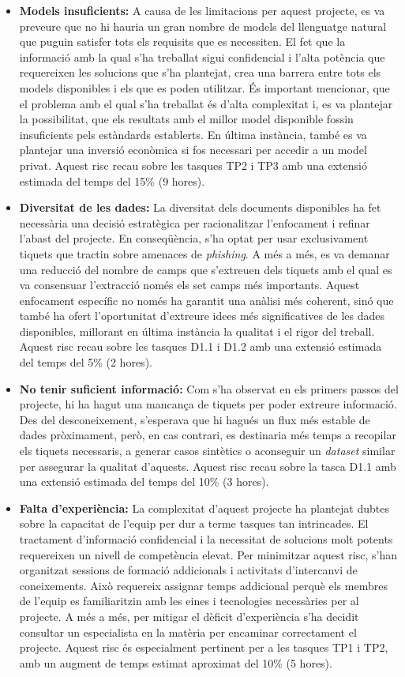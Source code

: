 \begin{itemize}
    \item \textbf{Models insuficients:} A causa de les limitacions per aquest projecte, es va preveure que no hi hauria un gran nombre de models del llenguatge natural que puguin satisfer tots els requisits que es necessiten. El fet que la informació amb la qual s'ha treballat sigui confidencial i l'alta potència que requereixen les solucions que s'ha plantejat, crea una barrera entre tots els models disponibles i els que es poden utilitzar. És important mencionar, que el problema amb el qual s'ha treballat és d'alta complexitat i, es va plantejar la possibilitat, que els resultats amb el millor model disponible fossin insuficients pels estàndards establerts. En última instància, també es va plantejar una inversió econòmica si fos necessari per accedir a un model privat. Aquest risc recau sobre les tasques TP2 i TP3 amb una extensió estimada del temps del 15\% (9 hores).
    \item \textbf{Diversitat de les dades:} La diversitat dels documents disponibles ha fet necessària una decisió estratègica per racionalitzar l'enfocament i refinar l'abast del projecte. En conseqüència, s'ha optat per usar exclusivament tiquets que tractin sobre amenaces de \textit{phishing}. A més a més, es va demanar una reducció del nombre de camps que s'extreuen dels tiquets amb el qual es va consensuar l'extracció només els set camps més importants. Aquest enfocament específic no només ha garantit una anàlisi més coherent, sinó que també ha ofert l'oportunitat d'extreure idees més significatives de les dades disponibles, millorant en última instància la qualitat i el rigor del treball. Aquest risc recau sobre les tasques D1.1 i D1.2 amb una extensió estimada del temps del 5\% (2 hores).
    \item \textbf{No tenir suficient informació:} Com s'ha observat en els primers passos del projecte, hi ha hagut una mancança de tiquets per poder extreure informació. Des del desconeixement, s'esperava que hi hagués un flux més estable de dades pròximament, però, en cas contrari, es destinaria més temps a recopilar els tiquets necessaris, a generar casos sintètics o aconseguir un \textit{dataset} similar per assegurar la qualitat d'aquests. Aquest risc recau sobre la tasca D1.1 amb una extensió estimada del temps del 10\% (3 hores).
    \item \textbf{Falta d'experiència:} La complexitat d'aquest projecte ha plantejat dubtes sobre la capacitat de l'equip per dur a terme tasques tan intrincades. El tractament d'informació confidencial i la necessitat de solucions molt potents requereixen un nivell de competència elevat. Per minimitzar aquest risc, s'han organitzat sessions de formació addicionals i activitats d'intercanvi de coneixements. Això requereix assignar temps addicional perquè els membres de l'equip es familiaritzin amb les eines i tecnologies necessàries per al projecte. A més a més, per mitigar el dèficit d'experiència s'ha decidit consultar un especialista en la matèria per encaminar correctament el projecte. Aquest risc és especialment pertinent per a les tasques TP1 i TP2, amb un augment de temps estimat aproximat del 10\% (5 hores).

\end{itemize}
